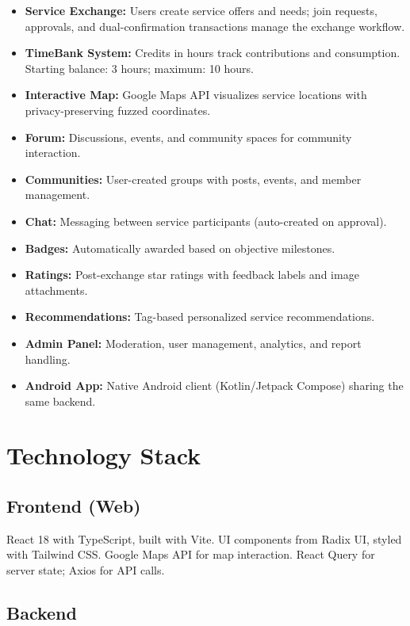 \documentclass[10pt,a4paper]{report}
\begin{document}
\begin{itemize}
    \item \textbf{Service Exchange:} Users create service offers and needs; join requests, approvals, and dual-confirmation transactions manage the exchange workflow.
    \item \textbf{TimeBank System:} Credits in hours track contributions and consumption. Starting balance: 3 hours; maximum: 10 hours.
    \item \textbf{Interactive Map:} Google Maps API visualizes service locations with privacy-preserving fuzzed coordinates.
    \item \textbf{Forum:} Discussions, events, and community spaces for community interaction.
    \item \textbf{Communities:} User-created groups with posts, events, and member management.
    \item \textbf{Chat:} Messaging between service participants (auto-created on approval).
    \item \textbf{Badges:} Automatically awarded based on objective milestones.
    \item \textbf{Ratings:} Post-exchange star ratings with feedback labels and image attachments.
    \item \textbf{Recommendations:} Tag-based personalized service recommendations.
    \item \textbf{Admin Panel:} Moderation, user management, analytics, and report handling.
    \item \textbf{Android App:} Native Android client (Kotlin/Jetpack Compose) sharing the same backend.
\end{itemize}

\section{Technology Stack}

\subsection{Frontend (Web)}

React 18 with TypeScript, built with Vite. UI components from Radix UI, styled with Tailwind CSS. Google Maps API for map interaction. React Query for server state; Axios for API calls.

\subsection{Backend}
\end{document}
